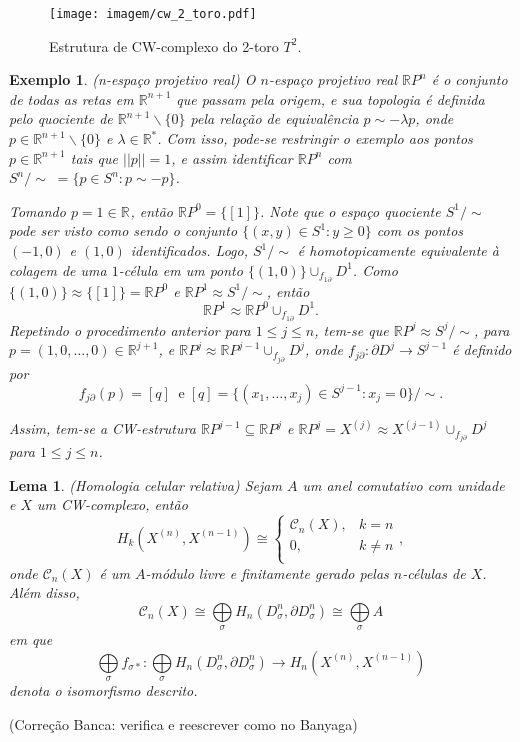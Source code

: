 \documentclass[12pt]{book}
\newtheorem{lema}[teorema]{Lema}
\newtheorem{exemplo}[teorema]{Exemplo}
\newcommand{\classe}[1]{[#1]}
\newcommand{\complementar}[2]{#1 \backslash #2}
\newcommand{\homologiarelcel}[3]{H_{#1}(D^{#2}_{#3}, \partial D^{#2}_{#3})}
\newcommand{\homologiarelskelesimpl}[2]{H_{#1}(X^{(#2)}, X^{(#2-1)})}
\newcommand{\norma}[1]{||#1||}
\newcommand{\real}[1]{\mathbb{R}^{#1}}
\newcommand{\realprojetivo}[1]{\mathbb{R}P^{#1}}
\newcommand{\reta}{\real{}}
\newcommand{\somadir}[1]{\bigoplus \limits_{#1}}
\newcommand{\skeleton}[1]{X^{(#1)}}
\newcommand{\alerta}[1]{{\color{red}#1}}
\newcommand{\correcaobanca}[1]{\alerta{(Correção Banca: #1)}}
\begin{document}
	\begin{figure}[!h]
		\centering
		\texttt{[image: imagem/cw\_2\_toro.pdf]}
		\caption{Estrutura de CW-complexo do 2-toro $T^{2}$.}
		\label{figura_cw_2_toro}
	\end{figure} 
	
	\begin{exemplo}
		(n-espaço projetivo real) O $n$-espaço projetivo real $\realprojetivo{n}$ é o conjunto de todas as retas em $\real{n+1}$ que passam pela origem, e sua topologia é definida pelo quociente de $\complementar{\real{n+1}}{\{0\}}$ pela relação de equivalência $p \sim -\lambda p$, onde $p\in \complementar{\real{n+1}}{\{0\}}$ e $\lambda\in \real{*}$. Com isso, pode-se restringir o exemplo aos pontos $p \in \real{n+1}$ tais que $\norma{p} = 1$, e assim identificar $\realprojetivo{n}$ com $S^{n}/\sim\;=\{p \in S^{n}: p\sim -p\}$.
		
		Tomando $p=1 \in \reta$, então $\realprojetivo{0} = \{\classe{1}\}$. Note que o espaço quociente $S^{1}/\sim$ pode ser visto como sendo o conjunto $\{(x,y) \in S^{1}: y\geq 0\}$ com os pontos $(-1,0)$ e $(1,0)$ identificados. Logo, $S^{1}/\sim$ é homotopicamente equivalente à colagem de uma $1$-célula em um ponto $\{(1,0)\}\cup_{f_{1\partial}}D^{1}$. Como $\{(1,0)\} \approx \{\classe{1}\} = \realprojetivo{0}$ e $\realprojetivo{1}\approx S^{1}/\sim$, então 
		$$
		\realprojetivo{1} \approx \realprojetivo{0}\cup_{f_{1\partial}} D^{1}.
		$$
		Repetindo o procedimento anterior para $1\leq j\leq n$, tem-se que $\realprojetivo{j} \approx S^{j}/\sim $, para $p = (1,0,\dots, 0) \in \real{j+1}$, e $\realprojetivo{j} \approx \realprojetivo{j-1} \cup_{f_{j\partial}}D^{j}$, onde $f_{j\partial}:\partial D^{j}\to S^{j-1}$ é definido por 
		$$
		f_{j\partial}(p) = \classe{q}\;\; \text{e}\; \classe{q}= \{ (x_{1}, \dots, x_{j}) \in S^{j-1}: x_{j}=0\}/\sim
		.
		$$
		
		Assim, tem-se a CW-estrutura $\realprojetivo{j-1} \subseteq \realprojetivo{j}$ e $\realprojetivo{j} = \skeleton{j} \approx \skeleton{j-1}\cup_{f_{j\partial}}D^{j}$ para $1\leq j \leq n$.
	\end{exemplo}
	
	\begin{lema}\label{homologiacelular}
		(Homologia celular relativa) Sejam $A$ um anel comutativo com unidade e $X$ um CW-complexo, então
		$$
		\homologiarelskelesimpl{k}{n} \cong 
		\left\{
		\begin{array}{cc}
		\mathcal{C}_{n}(X), & k = n\\
		0, & k\neq n\\
		\end{array}
		\right.,
		$$
		onde $\mathcal{C}_{n}(X)$ é um $A$-módulo livre e finitamente gerado pelas $n$-células de $X$. Além disso,
		$$
		\mathcal{C}_{n}(X) \cong \somadir{\sigma} \homologiarelcel{n}{n}{\sigma} \cong \somadir{\sigma} A
		$$
		em que 
		$$
		\somadir{\sigma}f_{\sigma*}: \somadir{\sigma} \homologiarelcel{n}{n}{\sigma} \to \homologiarelskelesimpl{n}{n}
		$$
		denota o isomorfismo descrito.
	\end{lema}
	\correcaobanca{verifica e reescrever como no Banyaga}
	
\end{document}
